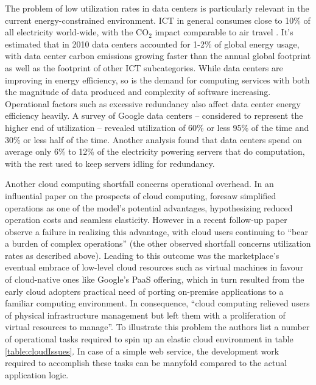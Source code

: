 The problem of low utilization rates in data centers is particularly relevant in the current energy-constrained environment. ICT in general consumes close to 10\% of all electricity world-wide, with the CO$_2$ impact comparable to air travel \parencite{buyya2017manifesto}. It's estimated that in 2010 data centers accounted for 1-2\% of global energy usage, with data center carbon emissions growing faster than the annual global footprint as well as the footprint of other ICT subcategories. While data centers are improving in energy efficiency, so is the demand for computing services with both the magnitude of data produced and complexity of software increasing. Operational factors such as excessive redundancy also affect data center energy efficiency heavily. A survey of Google data centers -- considered to represent the higher end of utilization -- revealed utilization of 60\% or less 95\% of the time and 30\% or less half of the time. Another analysis found that data centers spend on average only 6\% to 12\% of the electricity powering servers that do computation, with the rest used to keep servers idling for redundancy. \parencite{horner16powerusage}

Another cloud computing shortfall concerns operational overhead. In an influential paper on the prospects of cloud computing, \textcite{armbrust09berkeleyView} foresaw simplified operations as one of the model's potential advantages, hypothesizing reduced operation costs and seamless elasticity. However in a recent follow-up paper \textcite{jonas19berkeleyView} observe a failure in realizing this advantage, with cloud users continuing to ``bear a burden of complex operations'' (the other observed shortfall concerns utilization rates as described above). Leading to this outcome was the marketplace's eventual embrace of low-level cloud resources such as virtual machines in favour of cloud-native ones like Google's PaaS offering, which in turn resulted from the early cloud adopters practical need of porting on-premise applications to a familiar computing environment. In consequence, ``cloud computing relieved users of physical infrastructure management but left them with a proliferation of virtual resources to manage''. To illustrate this problem the authors list a number of operational tasks required to spin up an elastic cloud environment in table \ref{table:cloudIssues}. In case of a simple web service, the development work required to accomplish these tasks can be manyfold compared to the actual application logic.

